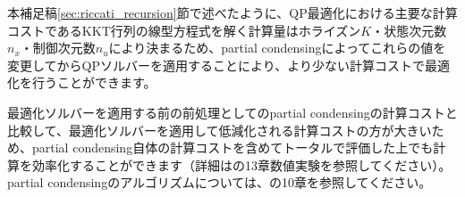 \documentclass[a4paper]{jarticle}
\begin{document}
本補足稿\ref{sec:riccati_recursion}節で述べたように、QP最適化における主要な計算コストであるKKT行列の線型方程式を解く計算量はホライズン$K$・状態次元数$n_x$・制御次元数$n_u$により決まるため、partial condensingによってこれらの値を変更してからQPソルバーを適用することにより、より少ない計算コストで最適化を行うことができます。


最適化ソルバーを適用する前の前処理としてのpartial condensingの計算コストと比較して、最適化ソルバーを適用して低減化される計算コストの方が大きいため、partial condensing自体の計算コストを含めてトータルで評価した上でも計算を効率化することができます（詳細は\cite{frison2015algorithms}の13章数値実験を参照してください）。
partial condensingのアルゴリズムについては、\cite{frison2015algorithms}の10章を参照してください。






\end{document}
